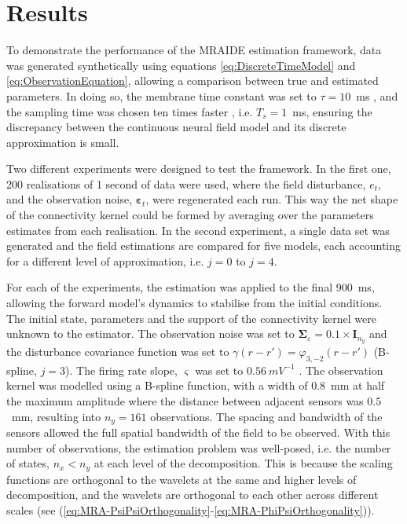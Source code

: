 \documentclass[review,authoryear,3p]{elsarticle}
\begin{document}
\section{Results}\label{sec:MRA-results}
To demonstrate the performance of the MRAIDE estimation framework, data was generated synthetically  using equations \eqref{eq:DiscreteTimeModel} and \eqref{eq:ObservationEquation}, allowing a comparison between true and estimated parameters. In doing so, the membrane time constant was set to $\tau = 10$~ms \citep{David2003}, and the sampling time was chosen ten times faster \citep{Stephan2008}, i.e. $T_s = 1$~ms, ensuring the discrepancy between the continuous neural field model and its discrete approximation is small. 

Two different experiments were designed to test the framework. In the first one, 200 realisations of 1 second of data were used, where the field disturbance, $e_t$, and the observation noise, $\boldsymbol\varepsilon_t$, were regenerated each run. This way the net shape of the connectivity kernel could be formed by averaging over the parameters estimates from each realisation. In the second experiment, a single data set was generated and the field estimations are compared for five models, each accounting for a different level of approximation, i.e. $j=0$ to $j=4$. 

For each of the experiments, the estimation was applied to the final 900~ms, allowing the forward model's dynamics to stabilise from the initial conditions. The initial state, parameters and the support of the connectivity kernel were unknown to the estimator. The observation noise was set to $\boldsymbol\Sigma_{\varepsilon}=0.1 \times \mathbf{I}_{n_y}$ and the disturbance covariance function was set to $\gamma(r-r') = \varphi_{3,-2}(r-r')$ (B-spline, $j=3$).  The firing rate slope, $\varsigma$ was set to $0.56~mV^{-1}$ \citep{Wendling2005}. The observation kernel was modelled using a B-spline function, with a width of 0.8~mm at half the maximum amplitude where the distance between adjacent sensors was $0.5$~mm, resulting into $n_y = 161$ observations. The spacing and bandwidth of the sensors allowed the full spatial bandwidth of the field to be observed.  With this number of observations, the estimation problem was well-posed, i.e. the number of states, $n_x < n_y$ at each level of the decomposition. This is because the scaling functions are orthogonal to the wavelets at the same and higher levels of decomposition, and  the wavelets are orthogonal to each other across different scales (see (\ref{eq:MRA-PsiPsiOrthogonality}-\ref{eq:MRA-PhiPsiOrthogonality})). 
\end{document}
